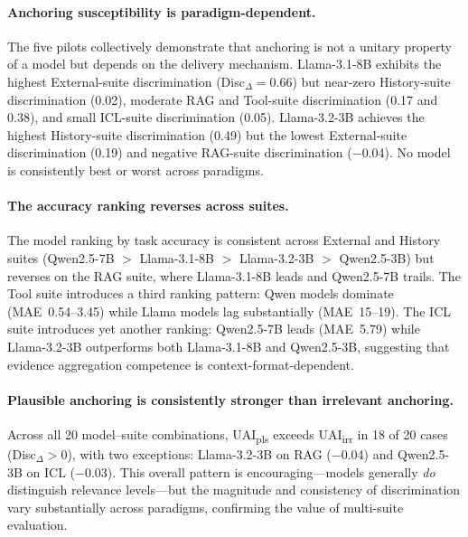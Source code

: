 \paragraph{Anchoring susceptibility is paradigm-dependent.}
The five pilots collectively demonstrate that anchoring is
not a unitary property of a model but depends on the delivery
mechanism.
Llama-3.1-8B exhibits the highest External-suite
discrimination (Disc$_{\Delta} = 0.66$) but near-zero
History-suite discrimination (0.02), moderate RAG and
Tool-suite discrimination (0.17 and 0.38), and small
ICL-suite discrimination (0.05).
Llama-3.2-3B achieves the highest History-suite
discrimination (0.49) but the lowest External-suite
discrimination (0.19) and negative RAG-suite discrimination
($-$0.04).
No model is consistently best or worst across paradigms.

\paragraph{The accuracy ranking reverses across suites.}
The model ranking by task accuracy is consistent across
External and History suites
(Qwen2.5-7B $>$ Llama-3.1-8B $>$ Llama-3.2-3B $>$
Qwen2.5-3B) but reverses on the RAG suite, where
Llama-3.1-8B leads and Qwen2.5-7B trails.
The Tool suite introduces a third ranking pattern:
Qwen models dominate (MAE~0.54--3.45) while Llama models
lag substantially (MAE~15--19).
The ICL suite introduces yet another ranking:
Qwen2.5-7B leads (MAE~5.79) while Llama-3.2-3B outperforms
both Llama-3.1-8B and Qwen2.5-3B, suggesting that evidence
aggregation competence is context-format-dependent.

\paragraph{Plausible anchoring is consistently stronger than
  irrelevant anchoring.}
Across all 20 model--suite combinations,
UAI\textsubscript{pls} exceeds UAI\textsubscript{irr} in
18 of 20 cases (Disc$_{\Delta} > 0$), with two exceptions:
Llama-3.2-3B on RAG ($-$0.04) and Qwen2.5-3B on ICL
($-$0.03).
This overall pattern is encouraging---models generally
\emph{do} distinguish relevance levels---but the
magnitude and consistency of discrimination vary
substantially across paradigms, confirming the value of
multi-suite evaluation.

